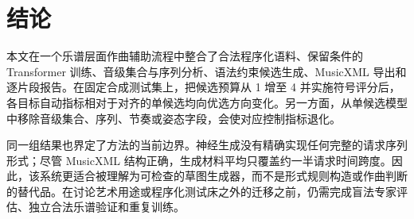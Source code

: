 \section{结论}
\label{sec:conclusion-zh}

本文在一个乐谱层面作曲辅助流程中整合了合法程序化语料、保留条件的 Transformer 训练、音级集合与序列分析、语法约束候选生成、MusicXML 导出和逐片段报告。在固定合成测试集上，把候选预算从 1 增至 4 并实施符号评分后，各目标自动指标相对于对齐的单候选均向优选方向变化。另一方面，从单候选模型中移除音级集合、序列、节奏或姿态字段，会使对应控制指标退化。

同一组结果也界定了方法的当前边界。神经生成没有精确实现任何完整的请求序列形式；尽管 MusicXML 结构正确，生成材料平均只覆盖约一半请求时间跨度。因此，该系统更适合被理解为可检查的草图生成器，而不是形式规则构造或作曲判断的替代品。在讨论艺术用途或程序化测试床之外的迁移之前，仍需完成盲法专家评估、独立合法乐谱验证和重复训练。
